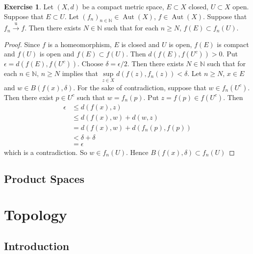 \documentclass[12pt]{amsart}
\theoremstyle{definition}
\newtheorem{ex}[definition]{Exercise}
\newcommand{\del}{\delta}
\newcommand{\ep}{\epsilon}
\newcommand{\N}{\mathbb{N}}
\newcommand{\convt}[1]{\xrightarrow{\text{#1}}}
\DeclareMathOperator{\Aut}{Aut}
\DeclareMathOperator*{\0}{\mbf{0}}
\DeclareMathOperator*{\1}{\mbf{1}}
\newcommand{\lex}[1]{\label{ex:#1}}
\begin{document}
	\begin{ex} \lex{}
	Let $(X, d)$ be a compact metric space, $E \subset X$ closed, $U \subset X$ open. Suppose that $E \subset U$. Let $(f_n)_{n \in \N} \in \Aut(X)$, $f \in \Aut(X)$.  Suppose that $f_n \convt{u} f$. Then there exists $N \in \N$ such that for each $n \geq N$, $f(E) \subset f_n(U)$.
	\end{ex}
	
	\begin{proof}
	Since $f$ is a homeomorphism, $E$ is closed and $U$ is open, $f(E)$ is compact and $f(U)$ is open and $f(E) \subset f(U)$. Then $d(f(E), f(U^c)) >0$. Put $\ep = d(f(E), f(U^c))$. Choose $\del = \ep/2$. Then there exists $N \in \N$ such that for each $n \in \N$, $n \geq N$ implies that $\sup\limits_{z \in X} d(f(z), f_n(z)) < \del$. Let $n \geq N$, $x \in E$ and $w \in B(f(x), \del)$. For the sake of contradiction, suppose that $w \in f_n(U^c)$. Then there exist $p \in U^c$ such that $w = f_n(p)$. Put $z = f(p) \in f(U^c)$. Then 
	\begin{align*}
	\ep 
	&\leq d(f(x), z) \\ 
	&\leq d(f(x), w) + d(w, z) \\
	& = d(f(x), w) + d(f_n(p), f(p))  \\
	& < \del + \del \\
	& = \ep
	\end{align*}
	which is a contradiction. So $w \in f_n(U)$. Hence $B(f(x), \del) \subset f_n(U)$
	\end{proof}
	
	
	
	
	
	
	
	
	
	
	\newpage
	\subsection{Product Spaces}
	
	
	
	
	
	
	
	
	
	
	
	
	
	\newpage
	\section{Topology}
	
	\subsection{Introduction}
	
\end{document}

